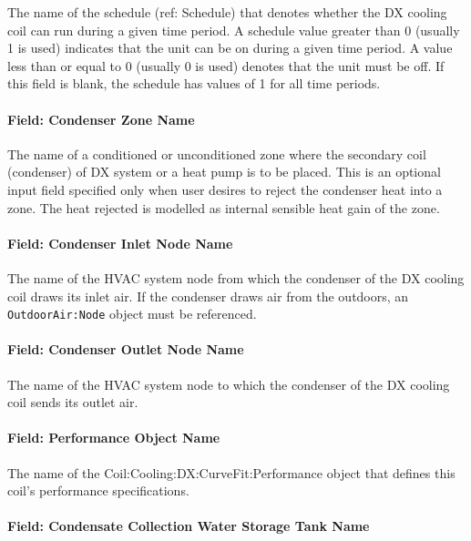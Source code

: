 The name of the schedule (ref: Schedule) that denotes whether the DX cooling coil can run during a given time period. A schedule value greater than 0 (usually 1 is used) indicates that the unit can be on during a given time period. A value less than or equal to 0 (usually 0 is used) denotes that the unit must be off. If this field is blank, the schedule has values of 1 for all time periods.

\paragraph{Field: Condenser Zone Name}\label{field-condenser-zone-name-6-001}

The name of a conditioned or unconditioned zone where the secondary coil (condenser) of DX system or a heat pump is to be placed. This is an optional input field specified only when user desires to reject the condenser heat into a zone. The heat rejected is modelled as internal sensible heat gain of the zone.

\paragraph{Field: Condenser Inlet Node Name}\label{field-condenser-inlet-node-name-6-001}

The name of the HVAC system node from which the condenser of the DX cooling coil draws its inlet air. If the condenser draws air from the outdoors, an \texttt{OutdoorAir:Node} object must be referenced.

\paragraph{Field: Condenser Outlet Node Name}\label{field-condenser-outlet-node-name-6-001}

The name of the HVAC system node to which the condenser of the DX cooling coil sends its outlet air.

\paragraph{Field: Performance Object Name}\label{field-performance-object-name-6-001}

The name of the Coil:Cooling:DX:CurveFit:Performance object that defines this coil's performance specifications.

\paragraph{Field: Condensate Collection Water Storage Tank Name}\label{field-condensate-collection-water-storage-tank-name-2}

